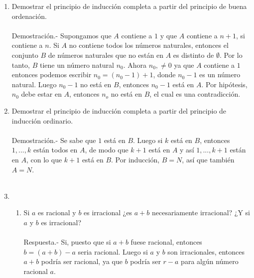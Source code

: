 \begin{enumerate}[\bfseries 1.]
      \item Demostrar el principio de inducción completa a partir del principio de buena ordenación.\\\\
      Demostración.-\; Supongamos que $A$ contiene a $1$ y que $A$ contiene a $n+1$, si contiene a $n$. Si $A$ no contiene todos los números naturales, entonces el conjunto $B$ de números naturales que no están en $A$ es distinto de $\emptyset$. Por lo tanto, $B$ tiene un número natural $n_0$. Ahora $n_0 ,\neq 0$ ya que $A$ contiene a $1$ entonces podemos escribir $n_0 = (n_0 -1) +1$, donde $n_0-1$ es un número natural. Luego $n_0-1$ no está en $B$, entonces $n_0 -1$ está en $A$. Por hipótesis, $n_0$ debe estar en $A$, entonces $n_o$ no está en $B$, el cual es una contradicción.             	 
      
      \item Demostrar el principio de inducción completa a partir del principio de inducción ordinario.\\\\
      Demostración.- \; Se sabe que $1$ está en $B$. Luego si $k$ está en $B$, entonces $1,...,k$ están todos en $A$, de modo que $k+1$ está en $A$ y así $1,...,k+1$ están en $A$, con lo que $k+1$ está en $B$. Por inducción, $B=N$, así que también $A=N$.\\\\

      \item 
	 \begin{enumerate}[\bfseries (a)]

	 \item Si $a$ es racional y \; $b$ es irracional ¿es $a+b$ necesariamente irracional? ¿Y si $a$ \; y \; $b$ es irracional? \\\\
	 Respuesta.- \; Si, puesto que si $a+b$ fuese racional, entonces $b=(a+b) -a$ seria racional. Luego si $a$ y $b$ son irracionales, entonces $a+b$ podría ser racional, ya que $b$ podría ser $r-a$ para algún número racional $a$.\\\\          


\end{enumerate}
\end{enumerate}
